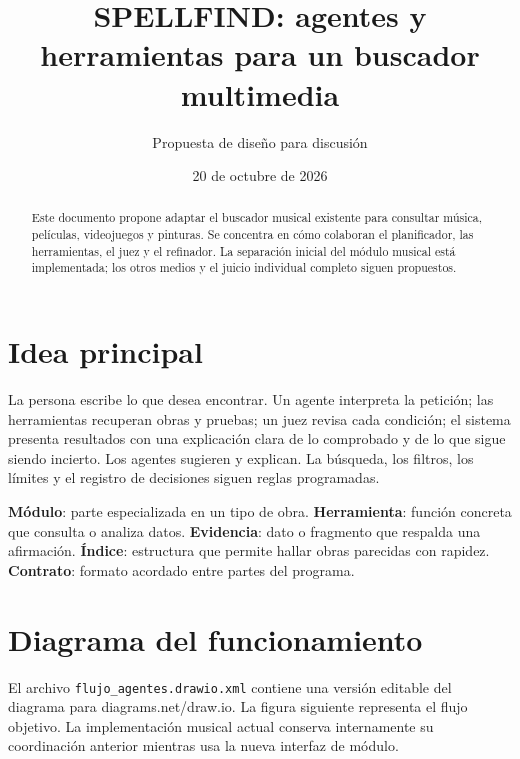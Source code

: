 \documentclass[11pt,a4paper]{article}
\title{SPELLFIND: agentes y herramientas para un buscador multimedia}
\author{Propuesta de diseño para discusión}
\date{20 de octubre de 2026}
\begin{document}
\maketitle
\begin{abstract}
Este documento propone adaptar el buscador musical existente para consultar música, películas, videojuegos y pinturas. Se concentra en cómo colaboran el planificador, las herramientas, el juez y el refinador. La separación inicial del módulo musical está implementada; los otros medios y el juicio individual completo siguen propuestos.
\end{abstract}
\tableofcontents
\newpage
\section{Idea principal}
La persona escribe lo que desea encontrar. Un agente interpreta la petición; las herramientas recuperan obras y pruebas; un juez revisa cada condición; el sistema presenta resultados con una explicación clara de lo comprobado y de lo que sigue siendo incierto. Los agentes sugieren y explican. La búsqueda, los filtros, los límites y el registro de decisiones siguen reglas programadas.

\textbf{Módulo}: parte especializada en un tipo de obra. \textbf{Herramienta}: función concreta que consulta o analiza datos. \textbf{Evidencia}: dato o fragmento que respalda una afirmación. \textbf{Índice}: estructura que permite hallar obras parecidas con rapidez. \textbf{Contrato}: formato acordado entre partes del programa.

\section{Diagrama del funcionamiento}
El archivo \texttt{flujo\_agentes.drawio.xml} contiene una versión editable del diagrama para diagrams.net/draw.io. La figura siguiente representa el flujo objetivo. La implementación musical actual conserva internamente su coordinación anterior mientras usa la nueva interfaz de módulo.
\end{document}
